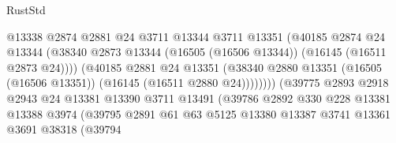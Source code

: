 \begin{lexlean}{RustStd}
\begin{coremodule}
                                          @13338
                                          @2874
                                          @2881
                                          @24
                                          @3711
                                          @13344
                                          @3711
                                          @13351
                                          (@40185
                                            @2874
                                            @24
                                            @13344
                                            (@38340
                                              @2873
                                              @13344
                                              (@16505 (@16506 @13344))
                                              (@16145 (@16511 @2873 @24))))
                                          (@40185
                                            @2881
                                            @24
                                            @13351
                                            (@38340
                                              @2880
                                              @13351
                                              (@16505 (@16506 @13351))
                                              (@16145 (@16511 @2880 @24))))))))
                                  (@39775
                                    @2893
                                    @2918
                                    @2943
                                    @24
                                    @13381
                                    @13390
                                    @3711
                                    @13491
                                    (@39786
                                      @2892
                                      @330
                                      @228
                                      @13381
                                      @13388
                                      @3974
                                      (@39795
                                        @2891
                                        @61
                                        @63
                                        @5125
                                        @13380
                                        @13387
                                        @3741
                                        @13361
                                        @3691
                                        @38318
                                        (@39794

\end{coremodule}
\end{lexlean}
